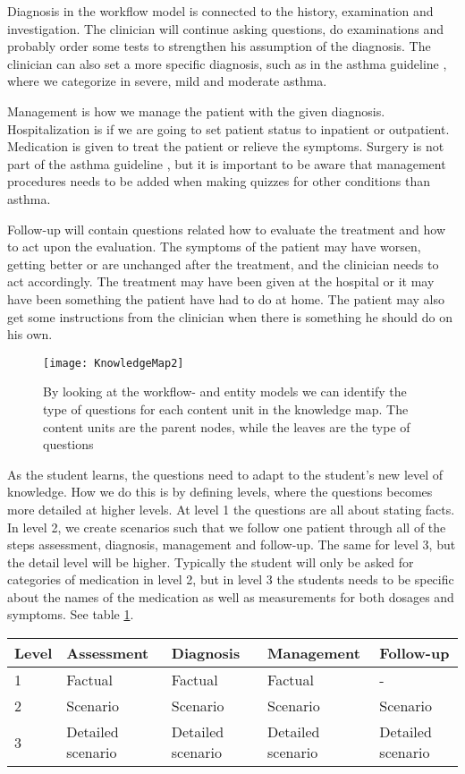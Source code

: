 Diagnosis in the workflow model is connected to the history, examination and investigation. The clinician will continue asking questions, do examinations and probably order some tests to strengthen his assumption of the diagnosis. The clinician can also set a more specific diagnosis, such as in the asthma guideline \parencite{RepublicofKeny2016}, where we categorize in severe, mild and moderate asthma.

Management is how we manage the patient with the given diagnosis. Hospitalization is if we are going to set patient status to inpatient or outpatient. Medication is given to treat the patient or relieve the symptoms. Surgery is not part of the asthma guideline \parencite{RepublicofKeny2016}, but it is important to be aware that management procedures needs to be added when making quizzes for other conditions than asthma.

Follow-up will contain questions related how to evaluate the treatment and how to act upon the evaluation. The symptoms of the patient may have worsen, getting better or are unchanged after the treatment, and the clinician needs to act accordingly. The treatment may have been given at the hospital or it may have been something the patient have had to do at home. The patient may also get some instructions from the clinician when there is something he should do on his own. 
\begin{figure}[h!]
	\caption {By looking at the workflow- and entity models we can identify the type of questions for each content unit in the knowledge map. The content units are the parent nodes, while the leaves are the type of questions}
	\label{fig:ExpandedKnowledgeMap}
	\texttt{[image: KnowledgeMap2]}
\end{figure}

As the student learns, the questions need to adapt to the student's new level of knowledge. How we do this is by defining levels, where the questions becomes more detailed at higher levels. At level 1 the questions are all about stating facts. In level 2, we create scenarios such that we follow one patient through all of the steps assessment, diagnosis, management and follow-up. The same for level 3, but the detail level will be higher. Typically the student will only be asked for categories of medication in level 2, but in level 3 the students needs to be specific about the names of the medication as well as measurements for both dosages and symptoms. See table \ref{table:ProgressionGranularity}.
\begin{table}[h!]
	\label{table:ProgressionGranularity}
	\begin{tabular}{|m{2em}|m{6em}|m{6em}|m{6em}|m{6em}|}
		\hline
		Level & Assessment & Diagnosis & Management & Follow-up \\
		\hline
		1  & Factual & Factual & Factual & - \\
		2 & Scenario & Scenario & Scenario & Scenario \\
		3 & Detailed scenario  & Detailed scenario & Detailed scenario & Detailed scenario \\
		\hline
	\end{tabular}
\end{table}





